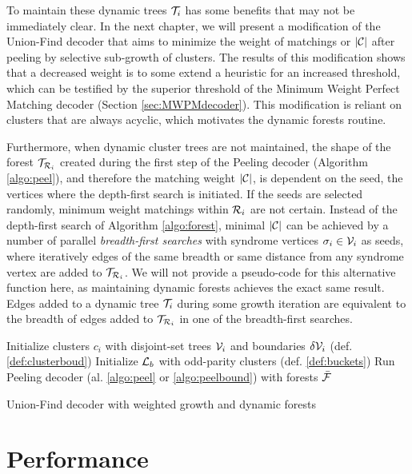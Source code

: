 To maintain these dynamic trees $\mathcal{T}_i$ has some benefits that may not be immediately clear. In the next chapter, we will present a modification of the Union-Find decoder that aims to minimize the weight of matchings or $|\mathcal{C}|$ after peeling by selective sub-growth of clusters. The results of this modification shows that a decreased weight is to some extend a heuristic for an increased threshold, which can be testified by the superior threshold of the Minimum Weight Perfect Matching decoder (Section \ref{sec:MWPMdecoder}). This modification is reliant on clusters that are always acyclic, which motivates the dynamic forests routine. 

Furthermore, when dynamic cluster trees are not maintained, the shape of the forest $\mathcal{T}_{\mathcal{R}_i}$ created during the first step of the Peeling decoder (Algorithm \ref{algo:peel}), and therefore the matching weight $|\mathcal{C}|$, is dependent on the seed, the vertices where the depth-first search is initiated. If the seeds are selected randomly, minimum weight matchings within $\mathcal{R}_i$ are not certain. Instead of the depth-first search of Algorithm \ref{algo:forest}, minimal $|\mathcal{C}|$ can be achieved by a number of parallel \emph{breadth-first searches} with syndrome vertices $\sigma_i \in \mathcal{V}_i$ as seeds, where iteratively edges of the same breadth or same distance from any syndrome vertex are added to $\mathcal{T}_{\mathcal{R}_i}$. We will not provide a pseudo-code for this alternative  function here, as maintaining dynamic forests achieves the exact same result. Edges added to a dynamic tree $\mathcal{T}_i$ during some growth iteration are equivalent to the breadth of edges added to $\mathcal{T}_{\mathcal{R}_i}$ in one of the breadth-first searches. 

\begin{algorithm}[h]
  \BlankLine
  \BlankLine
  Initialize clusters $c_i$ with disjoint-set trees $\mathcal{V}_i$ and boundaries $\delta \mathcal{V}_i$ (def. \ref{def:clusterboud})\;
  Initialize $\mathcal{L}_b$ with odd-parity clusters (def. \ref{def:buckets})\;
  \BlankLine
  Run Peeling decoder (al. \ref{algo:peel} or \ref{algo:peelbound}) with forests $\bar{\mathcal{F}}$
  \BlankLine
  \caption{Union-Find decoder with weighted growth and dynamic forests}\label{algo:ufbucketdf}
\end{algorithm}


\section{Performance}
